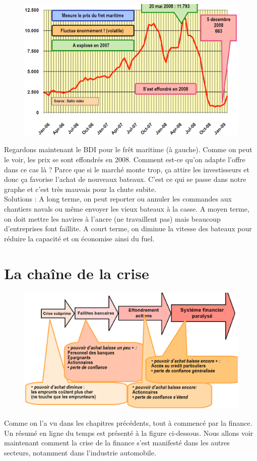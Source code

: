 \begin{figure}
	\includegraphics[scale=0.3]{14}
\end{figure}  
Regardons maintenant le BDI pour le frêt maritime (à gauche). Comme on peut le voir, les prix se sont effondrés en 2008. Comment est-ce qu'on adapte l'offre dans ce cas là ? Parce que si le marché monte trop, ça attire les investisseurs et donc ça favorise l'achat de nouveaux bateaux. C'est ce qui se passe dans notre graphe et c'est très mauvais pour la chute subite. \\
Solutions : A long terme, on peut reporter ou annuler les commandes aux chantiers navals ou même envoyer les vieux bateaux à la casse. A moyen terme, on doit mettre les navires à l'ancre (ne travaillent pas) mais beaucoup d'entreprises font faillite. A court terme, on diminue la vitesse des bateaux pour réduire la capacité et on économise ainsi du fuel. 

\section{La chaîne de la crise}
\begin{figure}
	\includegraphics[scale=0.3]{15}
\end{figure}
Comme on l'a vu dans les chapitres précédents, tout à commencé par la finance. Un résumé en ligne du temps est présenté à la figure ci-dessous. Nous allons voir maintenant comment la crise de la finance s'est manifesté dans les autres secteurs, notamment dans l'industrie automobile.\\\\

